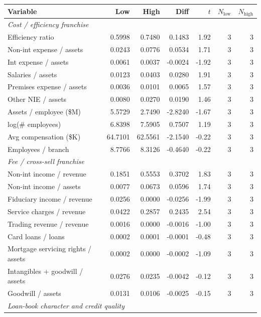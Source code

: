 \begin{tabular}{lrrrrrr}
\toprule
Variable & Low & High & Diff & $t$ & $N_{\text{low}}$ & $N_{\text{high}}$ \\
\midrule
\multicolumn{7}{l}{\emph{Cost / efficiency franchise}} \\
\midrule
Efficiency ratio & 0.5998 & 0.7480 & 0.1483 & 1.92 & 3 & 3 \\
Non-int expense / assets & 0.0243 & 0.0776 & 0.0534 & 1.71 & 3 & 3 \\
Int expense / assets & 0.0061 & 0.0037 & -0.0024 & -1.92 & 3 & 3 \\
Salaries / assets & 0.0123 & 0.0403 & 0.0280 & 1.91 & 3 & 3 \\
Premises expense / assets & 0.0036 & 0.0101 & 0.0065 & 1.57 & 3 & 3 \\
Other NIE / assets & 0.0080 & 0.0270 & 0.0190 & 1.46 & 3 & 3 \\
Assets / employee (\$M) & 5.5729 & 2.7490 & -2.8240 & -1.67 & 3 & 3 \\
log(\# employees) & 6.8398 & 7.5905 & 0.7507 & 1.19 & 3 & 3 \\
Avg compensation (\$K) & 64.7101 & 62.5561 & -2.1540 & -0.22 & 3 & 3 \\
Employees / branch & 8.7766 & 8.3126 & -0.4640 & -0.22 & 3 & 3 \\
\midrule
\multicolumn{7}{l}{\emph{Fee / cross-sell franchise}} \\
\midrule
Non-int income / revenue & 0.1851 & 0.5553 & 0.3702 & 1.83 & 3 & 3 \\
Non-int income / assets & 0.0077 & 0.0673 & 0.0596 & 1.74 & 3 & 3 \\
Fiduciary income / revenue & 0.0256 & 0.0000 & -0.0256 & -1.99 & 3 & 3 \\
Service charges / revenue & 0.0422 & 0.2857 & 0.2435 & 2.54 & 3 & 3 \\
Trading revenue / revenue & 0.0016 & 0.0000 & -0.0016 & -1.00 & 3 & 3 \\
Card loans / loans & 0.0002 & 0.0001 & -0.0001 & -0.48 & 3 & 3 \\
Mortgage servicing rights / assets & 0.0002 & 0.0000 & -0.0002 & -1.09 & 3 & 3 \\
Intangibles + goodwill / assets & 0.0276 & 0.0235 & -0.0042 & -0.12 & 3 & 3 \\
Goodwill / assets & 0.0131 & 0.0106 & -0.0025 & -0.15 & 3 & 3 \\
\midrule
\multicolumn{7}{l}{\emph{Loan-book character and credit quality}} \\

\end{tabular}
